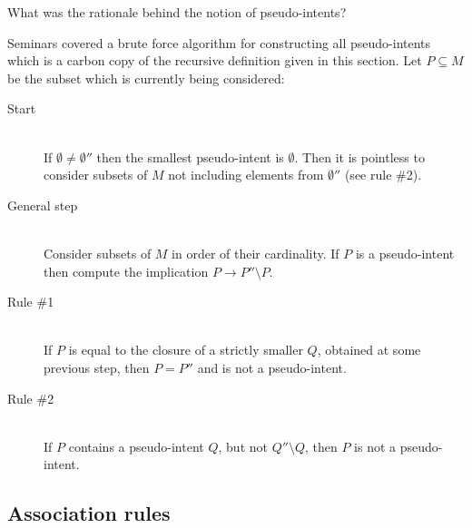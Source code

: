 \documentclass[a4paper]{article}
\newcommand{\Kcal}{\mathcal{K}}
\begin{document}
What was the rationale behind the notion of pseudo-intents?

Seminars covered a brute force algorithm for constructing all pseudo-intents which is a carbon copy of the recursive definition given in this section. Let $P\subseteq M$ be the subset which is currently being considered: \begin{description}
	\item[Start] \hfill \\ If $\emptyset\neq \emptyset''$ then the smallest pseudo-intent is $\emptyset$. Then it is pointless to consider subsets of $M$ not including elements from $\emptyset''$ (see rule \#2).
	\item[General step] \hfill \\ Consider subsets of $M$ in order of their cardinality. If $P$ is a pseudo-intent then compute the implication $P\to P''\setminus P$.
	\item[Rule \#1]\hfill \\ If $P$ is equal to the closure of a strictly smaller $Q$, obtained at some previous step, then $P=P''$ and is not a pseudo-intent.
	\item[Rule \#2]\hfill \\ If $P$ contains a pseudo-intent $Q$, but not $Q''\setminus Q$, then $P$ is not a pseudo-intent.
\end{description}







\subsection{Association rules} %
\label{sub:association_rules}
\end{document}
